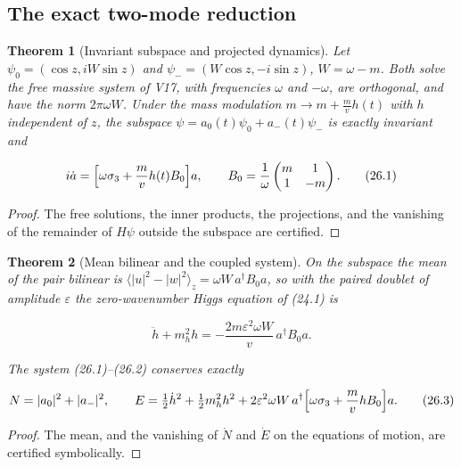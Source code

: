 \documentclass[11pt]{article}
\newtheorem{theorem}{Theorem}[section]
\theoremstyle{remark}
\begin{document}
\subsection{The exact two-mode reduction}

\begin{theorem}[Invariant subspace and projected dynamics]
\label{thm:v20v23-subspace}
Let \(\psi_0=(\cos z,iW\sin z)\) and \(\psi_-=(W\cos z,-i\sin z)\),
\(W=\omega-m\).  Both solve the free massive system of V17, with
frequencies \(\omega\) and \(-\omega\), are orthogonal, and have the
norm \(2\pi\omega W\).  Under the mass modulation
\(m\to m+\tfrac mvh(t)\) with \(h\) independent of \(z\), the subspace
\(\psi=a_0(t)\psi_0+a_-(t)\psi_-\) is exactly invariant and

\[
 i\dot a=\Bigl[\omega\sigma_3+\frac mvh(t)B_0\Bigr]a,\qquad
 B_0=\frac1\omega\begin{pmatrix}m&1\\1&-m\end{pmatrix}.               \tag{26.1}
\]
\end{theorem}

\begin{proof}
The free solutions, the inner products, the projections, and the
vanishing of the remainder of \(H\psi\) outside the subspace are
certified.
\end{proof}

\begin{theorem}[Mean bilinear and the coupled system]
\label{thm:v20v23-coupled}
On the subspace the mean of the pair bilinear is
\(\langle|u|^2-|w|^2\rangle_z=\omega W\,a^\dagger B_0a\), so with the
paired doublet of amplitude \(\varepsilon\) the zero-wavenumber Higgs
equation of (24.1) is

\[
 \ddot h+m_h^2h=-\frac{2m\varepsilon^2\omega W}v\,a^\dagger B_0a.       \tag{26.2}
\]

The system (26.1)--(26.2) conserves exactly

\[
 N=|a_0|^2+|a_-|^2,\qquad
 E=\tfrac12\dot h^2+\tfrac12m_h^2h^2+2\varepsilon^2\omega W\,a^\dagger\Bigl[\omega\sigma_3+\frac mvhB_0\Bigr]a.
                                                                    \tag{26.3}
\]
\end{theorem}

\begin{proof}
The mean, and the vanishing of \(\dot N\) and \(\dot E\) on the
equations of motion, are certified symbolically.
\end{proof}
\end{document}
